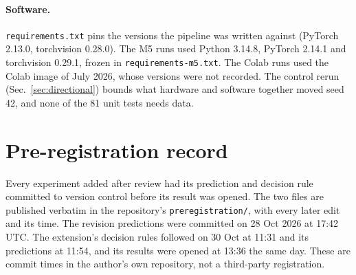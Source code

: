 \paragraph{Software.} \texttt{requirements.txt} pins the versions the pipeline was written
against (PyTorch 2.13.0, torchvision 0.28.0). The M5 runs used Python 3.14.8, PyTorch 2.14.1
and torchvision 0.29.1, frozen in \texttt{requirements-m5.txt}. The Colab runs used the Colab
image of July 2026, whose versions were not recorded. The control rerun
(Sec.~\ref{sec:directional}) bounds what hardware and software together moved seed 42, and
none of the 81 unit tests needs data.

\section{Pre-registration record}
\label{app:prereg}

Every experiment added after review had its prediction and decision rule committed to version
control before its result was opened. The two files are published verbatim in the
repository's \texttt{preregistration/}, with every later edit and its time. The revision
predictions were committed on 28 Oct 2026 at 17:42 UTC. The extension's decision rules
followed on 30 Oct at 11:31 and its predictions at 11:54, and its results were opened at 13:36
the same day. These are commit times in the author's own repository, not a third-party
registration.

